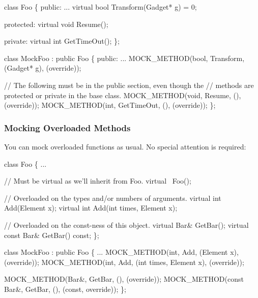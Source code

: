 \begin{DoxyCode}
\textcolor{keyword}{class }Foo \{
 \textcolor{keyword}{public}:
  ...
  \textcolor{keyword}{virtual} \textcolor{keywordtype}{bool} Transform(Gadget* g) = 0;

 \textcolor{keyword}{protected}:
  \textcolor{keyword}{virtual} \textcolor{keywordtype}{void} Resume();

 \textcolor{keyword}{private}:
  \textcolor{keyword}{virtual} \textcolor{keywordtype}{int} GetTimeOut();
\};

\textcolor{keyword}{class }MockFoo : \textcolor{keyword}{public} Foo \{
 \textcolor{keyword}{public}:
  ...
  MOCK\_METHOD(\textcolor{keywordtype}{bool}, Transform, (Gadget* g), (\textcolor{keyword}{override}));

  \textcolor{comment}{// The following must be in the public section, even though the}
  \textcolor{comment}{// methods are protected or private in the base class.}
  MOCK\_METHOD(\textcolor{keywordtype}{void}, Resume, (), (\textcolor{keyword}{override}));
  MOCK\_METHOD(\textcolor{keywordtype}{int}, GetTimeOut, (), (\textcolor{keyword}{override}));
\};
\end{DoxyCode}


\subsubsection*{Mocking Overloaded Methods}

You can mock overloaded functions as usual. No special attention is required\+:


\begin{DoxyCode}
\textcolor{keyword}{class }Foo \{
  ...

  \textcolor{comment}{// Must be virtual as we'll inherit from Foo.}
  \textcolor{keyword}{virtual} ~Foo();

  \textcolor{comment}{// Overloaded on the types and/or numbers of arguments.}
  \textcolor{keyword}{virtual} \textcolor{keywordtype}{int} Add(Element x);
  \textcolor{keyword}{virtual} \textcolor{keywordtype}{int} Add(\textcolor{keywordtype}{int} times, Element x);

  \textcolor{comment}{// Overloaded on the const-ness of this object.}
  \textcolor{keyword}{virtual} Bar& GetBar();
  \textcolor{keyword}{virtual} \textcolor{keyword}{const} Bar& GetBar() \textcolor{keyword}{const};
\};

\textcolor{keyword}{class }MockFoo : \textcolor{keyword}{public} Foo \{
  ...
  MOCK\_METHOD(\textcolor{keywordtype}{int}, Add, (Element x), (\textcolor{keyword}{override}));
  MOCK\_METHOD(\textcolor{keywordtype}{int}, Add, (\textcolor{keywordtype}{int} times, Element x), (\textcolor{keyword}{override}));

  MOCK\_METHOD(Bar&, GetBar, (), (\textcolor{keyword}{override}));
  MOCK\_METHOD(\textcolor{keyword}{const} Bar&, GetBar, (), (\textcolor{keyword}{const}, \textcolor{keyword}{override}));
\};
\end{DoxyCode}


